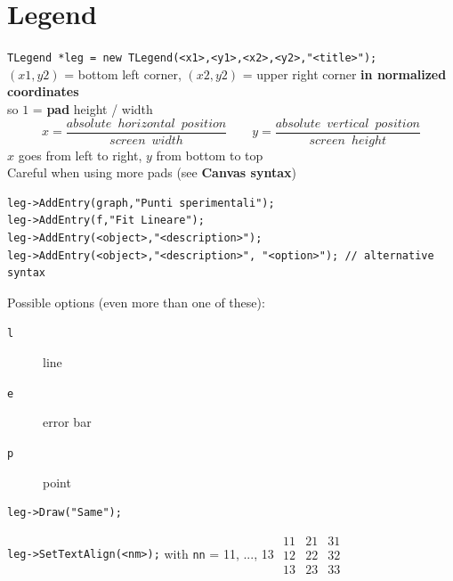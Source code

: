 \documentclass[10pt, twoside]{article}
\newcommand{\ttt}[1]{\colorbox{boxgray}{\texttt{#1}}}
\begin{document}
\newpage
\section{Legend}
\ttt{TLegend *leg = new TLegend(<x1>,<y1>,<x2>,<y2>,"<title>");}
\\$(x1,y2)$ = bottom left corner, $(x2,y2)$ = upper right corner \textbf{in normalized coordinates} \\so $1$ = \textbf{pad} height / width
\[x = \frac{absolute \enspace horizontal \enspace position}{screen \enspace width} \qquad y = \frac{absolute \enspace vertical \enspace position}{screen \enspace height}\]
$x$ goes from left to right, $y$ from bottom to top\\
Careful when using more pads (see\textbf{ Canvas syntax})
\begin{verbatim}
leg->AddEntry(graph,"Punti sperimentali"); 
leg->AddEntry(f,"Fit Lineare"); 
leg->AddEntry(<object>,"<description>");
leg->AddEntry(<object>,"<description>", "<option>"); // alternative syntax
\end{verbatim}
Possible options (even more than one of these): 
\begin{description}
\item[\ttt{l}] line
\item[\ttt{e}] error bar
\item[\ttt{p}] point
\end{description}

\begin{verbatim}
leg->Draw("Same"); 
\end{verbatim}
\ttt{leg->SetTextAlign(<nm>);} with \texttt{nn} = 11, ..., 13 \hfill $\begin{array}{c|c|c} 11 & 21 & 31 \\\hline
12 & 22 & 32 \\\hline
13 & 23 & 33
\end{array}$
\end{document}

